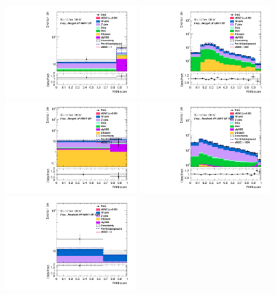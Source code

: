 \begin{figure}[]
    \includegraphics[width=0.45\textwidth]{figures/aQGC/PostFit/Region_distRNN_DSRVBSHPHMtvvJ1050_BMin0_J0_incJet1_L0_T0_incFat1_Y6051_incTag1_Fat1_GlobalFit_unconditionnal_mu1log}    \includegraphics[width=0.45\textwidth]{figures/aQGC/PostFit/Region_distRNN_DSRVBSLPLMtvvJ1200_BMin0_J0_incJet1_L0_T0_incFat1_Y6051_incTag1_Fat1_GlobalFit_unconditionnal_mu1log}     \includegraphics[width=0.45\textwidth]{figures/aQGC/PostFit/Region_distRNN_DSRVBSLPHMtvvJ1200_BMin0_J0_incJet1_L0_T0_incFat1_Y6051_incTag1_Fat1_GlobalFit_unconditionnal_mu1log}    \includegraphics[width=0.45\textwidth]{figures/aQGC/PostFit/Region_distRNN_DSRVBSFidLMtvvjj1200_BMin0_T0_Y6051_incTag1_J2_L0_incJet1_GlobalFit_unconditionnal_mu1log}
    \includegraphics[width=0.45\textwidth]{figures/aQGC/PostFit/Region_distRNN_DSRVBSFidHMtvvjj1200_BMin0_T0_Y6051_incTag1_J2_L0_incJet1_GlobalFit_unconditionnal_mu1log}

\end{figure}
